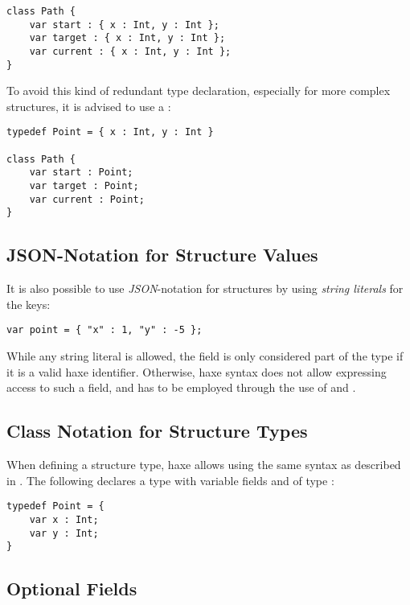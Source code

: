 \documentclass{haxe}
\begin{document}
\begin{lstlisting}
class Path {
    var start : { x : Int, y : Int };
    var target : { x : Int, y : Int };
    var current : { x : Int, y : Int };
}
\end{lstlisting}
To avoid this kind of redundant type declaration, especially for more complex structures, it is advised to use a :

\begin{lstlisting}
typedef Point = { x : Int, y : Int }

class Path {
    var start : Point;
    var target : Point;
    var current : Point;
}
\end{lstlisting}


\subsection{JSON-Notation for Structure Values}
\label{types-structure-json-notation}

It is also possible to use \emph{JSON}-notation for structures by using \emph{string literals} for the keys:

\begin{lstlisting}
var point = { "x" : 1, "y" : -5 };
\end{lstlisting}
While any string literal is allowed, the field is only considered part of the type if it is a valid haxe identifier. Otherwise, haxe syntax does not allow expressing access to such a field, and  has to be employed through the use of  and .


\subsection{Class Notation for Structure Types}
\label{types-structure-class-notation}

When defining a structure type, haxe allows using the same syntax as described in . The following  declares a  type with variable fields  and  of type :

\begin{lstlisting}
typedef Point = {
    var x : Int;
    var y : Int;
}
\end{lstlisting}

\subsection{Optional Fields}
\label{types-structure-optional-fields}
\end{document}
